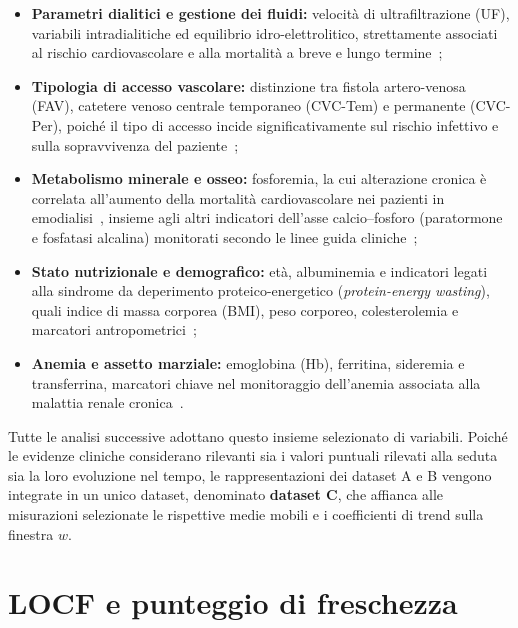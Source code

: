 \documentclass[a4paper,12pt]{report}
\begin{document}
\begin{itemize}
    \item \textbf{Parametri dialitici e gestione dei fluidi:} velocità di ultrafiltrazione (UF), variabili intradialitiche ed equilibrio idro-elettrolitico, strettamente associati al rischio cardiovascolare e alla mortalità a breve e lungo termine~\cite{FLYTHE2011250, FLYTHE2020, NANOVIC2005};
    \item \textbf{Tipologia di accesso vascolare:} distinzione tra fistola artero-venosa (FAV), catetere venoso centrale temporaneo (CVC-Tem) e permanente (CVC-Per), poiché il tipo di accesso incide significativamente sul rischio infettivo e sulla sopravvivenza del paziente~\cite{10.1093/qjmed/hcs143, Stefan2025PatternsAO, LOK2020S1};
    \item \textbf{Metabolismo minerale e osseo:} fosforemia, la cui alterazione cronica è correlata all'aumento della mortalità cardiovascolare nei pazienti in emodialisi~\cite{10.1093/ndt/gfaa054}, insieme agli altri indicatori dell'asse calcio--fosforo (paratormone e fosfatasi alcalina) monitorati secondo le linee guida cliniche~\cite{2024S117};
    \item \textbf{Stato nutrizionale e demografico:} età, albuminemia e indicatori legati alla sindrome da deperimento proteico-energetico (\textit{protein-energy wasting}), quali indice di massa corporea (BMI), peso corporeo, colesterolemia e marcatori antropometrici~\cite{MSAAD2019, FOUQUE2008391};
    \item \textbf{Anemia e assetto marziale:} emoglobina (Hb), ferritina, sideremia e transferrina, marcatori chiave nel monitoraggio dell'anemia associata alla malattia renale cronica~\cite{2024S117}.
\end{itemize}

Tutte le analisi successive adottano questo insieme selezionato di variabili. Poiché le evidenze cliniche considerano rilevanti sia i valori puntuali rilevati alla seduta sia la loro evoluzione nel tempo, le rappresentazioni dei dataset A e B vengono integrate in un unico dataset, denominato \textbf{dataset C}, che affianca alle misurazioni selezionate le rispettive medie mobili e i coefficienti di trend sulla finestra \(w\).

\section{LOCF e punteggio di freschezza}
\label{sec:locf_and_freshness}
\end{document}
